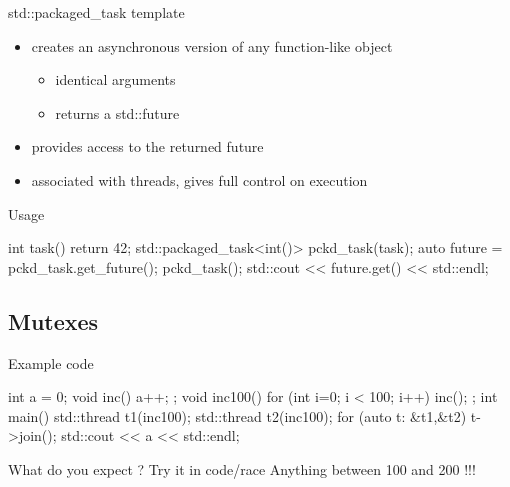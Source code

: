 \begin{frame}[fragile]
  \begin{block}{std::packaged\_task template}
    \begin{itemize}
    \item creates an asynchronous version of any function-like object
      \begin{itemize}
      \item identical arguments
      \item returns a std::future
      \end{itemize}
    \item provides access to the returned future
    \item associated with threads, gives full control on execution
    \end{itemize}
  \end{block}
  \pause
  \begin{exampleblock}{Usage}
    \begin{cppcode*}{}
      int task() { return 42; }
      std::packaged_task<int()> pckd_task(task);
      auto future = pckd_task.get_future();
      pckd_task();
      std::cout << future.get() << std::endl;
    \end{cppcode*}
  \end{exampleblock}
\end{frame}

\subsection[mutex]{Mutexes}

\begin{frame}[fragile]
  \begin{exampleblock}{Example code}
    \begin{cppcode*}{}
      int a = 0;
      void inc() { a++; };
      void inc100() {
        for (int i=0; i < 100; i++) inc();
      };
      int main() {
        std::thread t1(inc100);
        std::thread t2(inc100);
        for (auto t: {&t1,&t2}) t->join();
        std::cout << a << std::endl;
      }
    \end{cppcode*}
  \end{exampleblock}
  \pause
  \begin{block}{What do you expect ? Try it in code/race}
    \pause
    Anything between 100 and 200 !!!
  \end{block}
\end{frame}

